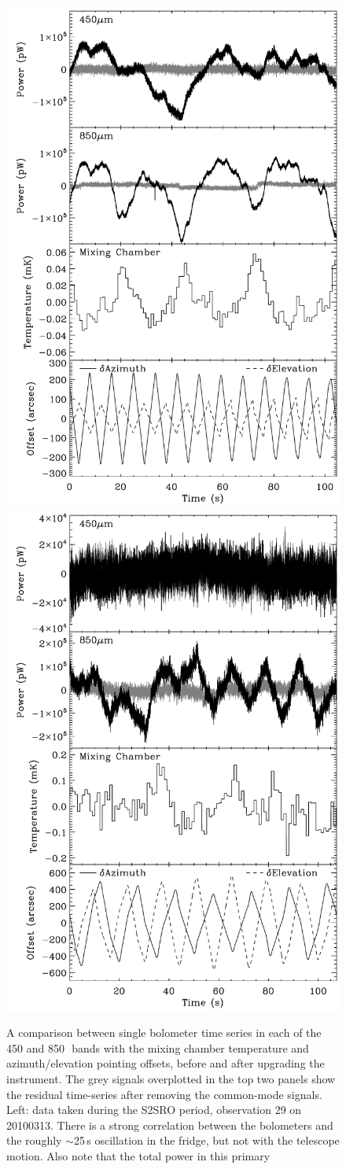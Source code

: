 \documentclass[useAMS,usenatbib,nofootinbib]{mn2e}
\begin{document}
\begin{figure}
\centering
\includegraphics[width=0.49\linewidth]{bolos_point_mix_s2sro.pdf}
\includegraphics[width=0.49\linewidth]{bolos_point_mix.pdf}
\caption{A comparison between single bolometer time series in each of
  the 450 and 850\,\micron\ bands with the mixing chamber temperature
  and azimuth/elevation pointing offsets, before and after upgrading
  the instrument. The grey signals overplotted in the top two panels
  show the residual time-series after removing the common-mode
  signals.  Left: data taken during the S2SRO period, observation 29
  on 20100313. There is a strong correlation between the bolometers
  and the roughly $\sim$25\,s oscillation in the fridge, but not with
  the telescope motion. Also note that the total power in this primary
}
\end{figure}
\end{document}
